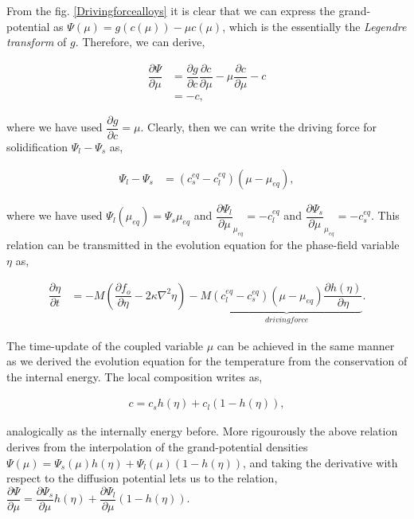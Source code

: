 \documentclass[english]{iambook}
\begin{document}
  From the fig. \ref{Drivingforcealloys} it is clear that we can express the 
  grand-potential as $\Psi(\mu) = g(c(\mu)) -\mu c\left(\mu\right)$, which is the 
  essentially the \textit{Legendre transform} of $g$. Therefore, we can derive, 
  
  \begin{align}
   \dfrac{\partial \Psi}{\partial \mu} &= \dfrac{\partial g}{\partial c}\dfrac{\partial c}{\partial \mu} - \mu \dfrac{\partial c}{\partial \mu} -c\\
                                       &= -c,
  \end{align}
  
  where we have used $\dfrac{\partial g}{\partial c}=\mu$. Clearly, then we can write 
  the driving force for solidification $\Psi_l-\Psi_s$ as,
  
  \begin{align}
   \Psi_l-\Psi_s &= (c_s^{eq} - c_l^{eq})\left(\mu-\mu_{eq}\right),
  \end{align}
  
  where we have used $\Psi_l\left(\mu_{eq}\right) = \Psi_s{\mu_{eq}}$ and $\dfrac{\partial \Psi_l}{\partial \mu}_{\mu_{eq}} = -c_l^{eq}$
  and $\dfrac{\partial \Psi_s}{\partial \mu}_{\mu_{eq}} = -c_s^{eq}$. This relation can be 
  transmitted in the evolution equation for the phase-field variable $\eta$ as,
  
  \begin{align}
  \dfrac{\partial \eta}{\partial t} &= -M \left(\dfrac{\partial f_o}{\partial \eta} - 2\kappa\nabla^{2}\eta\right)  
					-M\underbrace{(c_l^{eq} - c_s^{eq})\left(\mu-\mu_{eq}\right)\dfrac{\partial h\left(\eta\right)}{\partial \eta}}_{driving force}.
  \end{align}

  The time-update of the coupled variable $\mu$ can be achieved in the same manner 
  as we derived the evolution equation for the temperature from the conservation of
  the internal energy. The local composition writes as, 
  
  \begin{align}
   c = c_s h\left(\eta\right) + c_l (1 - h\left(\eta\right)), 
  \end{align}
  
  analogically as the internally energy before. More rigourously the above relation derives from the 
  interpolation of the grand-potential densities $\Psi\left(\mu\right) = 
  \Psi_s\left(\mu\right) h\left(\eta\right) + \Psi_l\left(\mu\right) (1 - h\left(\eta\right))$,
  and taking the derivative with respect to the diffusion potential lets us to the relation, 
  $\dfrac{\partial \Psi}{\partial \mu} = \dfrac{\partial \Psi_s}{\partial \mu} h\left(\eta\right) 
  + \dfrac{\partial \Psi_l}{\partial \mu} (1-h\left(\eta\right))$.
 
\end{document}
